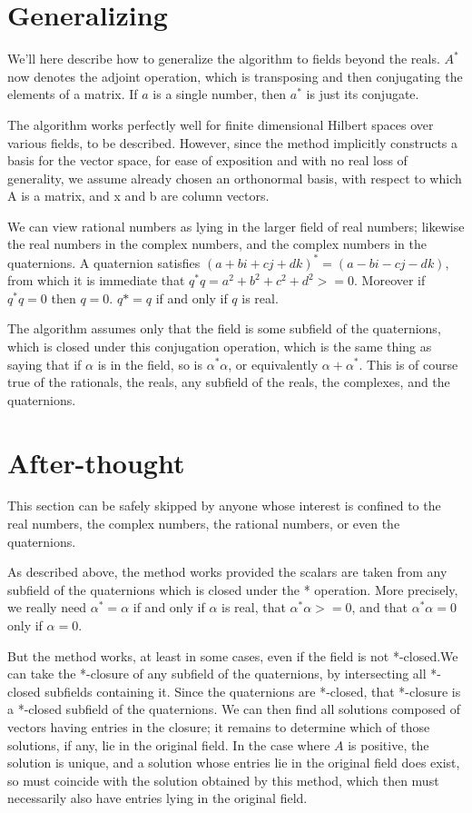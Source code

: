 \documentclass{article}
\begin{document}
\section{Generalizing}

We'll here describe how to generalize the algorithm to fields beyond the reals.
$A^*$ now denotes the adjoint operation, which is transposing and then
conjugating the elements of a matrix. If $a$ is a single number, then $a^*$ is
just its conjugate.

The algorithm works perfectly well for finite dimensional Hilbert spaces over various fields, to be described. However, since the method implicitly constructs a basis for the vector space, for ease of exposition and with no real loss of generality, we assume already chosen an orthonormal basis, with respect to which A is a matrix, and x and b are column vectors.

We can view rational numbers as lying in the larger field of real numbers; likewise the real numbers in the complex numbers, and the complex numbers in the quaternions. A quaternion satisfies $(a + bi +cj + dk)^* = (a -bi -cj -dk)$, from which it is immediate that $q^*q = a^2 + b^2 + c^2 + d^2 >= 0$. Moreover if $q^*q =0$ then $q =0$.
$q* = q$ if and only if $q$ is real.

The algorithm assumes only that the field is some subfield of the quaternions, which is closed under this conjugation operation, which is the same thing as saying that if $\alpha$ is in the field, so is $\alpha^*\alpha$, or equivalently $\alpha + \alpha^*$. This is of course true of the rationals, the reals, any subfield of the reals, the complexes, and the quaternions.

\section{After-thought}
This section can be safely skipped by anyone whose interest is confined to
the real numbers, the complex numbers, the rational numbers, or even the quaternions.

As described above, the method works provided the scalars are taken from any subfield of the
quaternions which is closed under the * operation. More precisely, we really
need $\alpha^* = \alpha$ if and only if $\alpha$ is real, that $\alpha^*\alpha >= 0$, and that 
$\alpha^*\alpha = 0$ only if $\alpha=0$.

But the method works, at least in some cases, even if the field is not *-closed.We can take the *-closure of any subfield of the quaternions, by intersecting all *-closed subfields containing it. Since the quaternions are *-closed, that *-closure is a *-closed subfield of the quaternions. We can then find all solutions composed of vectors having entries in the closure; it remains to determine
which of those solutions, if any, lie in the original field. In the case where
$A$ is positive, the solution is unique, and a solution whose entries lie in the original field does exist, so must coincide with the solution obtained by this method, which then must necessarily also have entries lying in the original field.
\newpage
\end{document}
